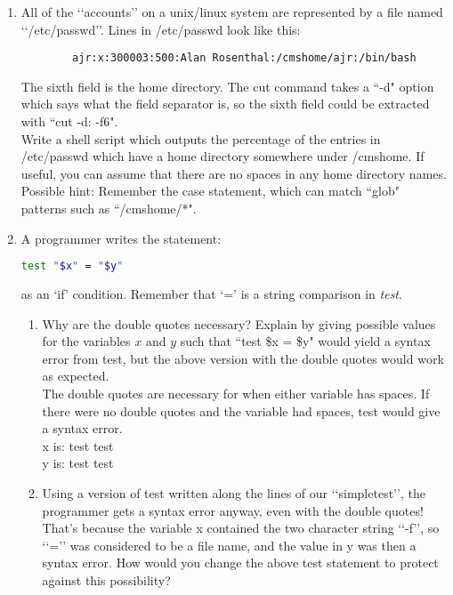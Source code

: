 \documentclass[11pt]{article}
\begin{document}
\begin{enumerate}
	\item All of the ‘‘accounts’’ on a unix/linux system are represented by a file named ‘‘/etc/passwd’’.
	Lines in /etc/passwd look like this:\begin{lstlisting}
		ajr:x:300003:500:Alan Rosenthal:/cmshome/ajr:/bin/bash\end{lstlisting}
	The sixth field is the home directory.
	The cut command takes a ``-d" option which says what the field separator is, so the sixth field could be extracted with ``cut -d: -f6".\\
	\hspace*{1cm}Write a shell script which outputs the percentage of the entries in /etc/passwd which have a home directory somewhere under /cmshome. If useful, you can assume that there are no spaces in any home directory names.\\
	\hspace*{1cm}	Possible hint: Remember the case statement, which can match ``glob" patterns such as ``/cmshome/*".
		
		
	\newpage
	\item A programmer writes the statement:\begin{lstlisting}[language=sh]
	test "$x" = "$y"\end{lstlisting}
	as an `if' condition. Remember that `=' is a string comparison in \textit{test}.
		\begin{enumerate}
			\item Why are the double quotes necessary? Explain by giving possible values for the variables $ x $ and $ y $ such that ``test \$x = \$y" would yield a syntax error from test, but the above version with the double quotes would work as expected.\\
				The double quotes are necessary for when either variable has spaces. If there were no double quotes and the variable had spaces, test would give a syntax error.\\
				x is: test test\\
				y is: test test
			\item Using a version of test written along the lines of our ‘‘simpletest’’, the programmer gets a syntax error anyway, even with the double quotes! That’s because the variable x contained the two character string ‘‘-f’’, so ‘‘=’’ was considered to be a file name, and the value in y was then a syntax error. How would you change the above test statement to protect against this possibility?
				
		\end{enumerate}
	

\end{enumerate}
\end{document}
